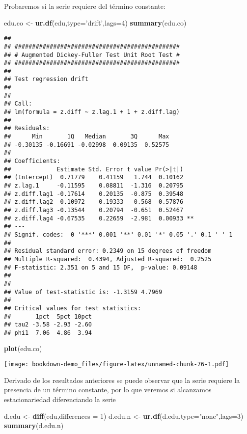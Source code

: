 \documentclass[]{book}
\newenvironment{Shaded}{\begin{snugshade}}{\end{snugshade}}
\newcommand{\KeywordTok}[1]{\textcolor[rgb]{0.13,0.29,0.53}{\textbf{#1}}}
\newcommand{\DataTypeTok}[1]{\textcolor[rgb]{0.13,0.29,0.53}{#1}}
\newcommand{\DecValTok}[1]{\textcolor[rgb]{0.00,0.00,0.81}{#1}}
\newcommand{\StringTok}[1]{\textcolor[rgb]{0.31,0.60,0.02}{#1}}
\newcommand{\NormalTok}[1]{#1}
\theoremstyle{definition}
\theoremstyle{definition}
\theoremstyle{definition}
\theoremstyle{remark}
\begin{document}
Probaremos si la serie requiere del término constante:

\begin{Shaded}
\begin{Highlighting}[]
\NormalTok{edu.co <-}\StringTok{ }\KeywordTok{ur.df}\NormalTok{(edu,}\DataTypeTok{type=}\StringTok{'drift'}\NormalTok{,}\DataTypeTok{lags=}\DecValTok{4}\NormalTok{)}
\KeywordTok{summary}\NormalTok{(edu.co)}
\end{Highlighting}
\end{Shaded}

\begin{verbatim}
## 
## ############################################### 
## # Augmented Dickey-Fuller Test Unit Root Test # 
## ############################################### 
## 
## Test regression drift 
## 
## 
## Call:
## lm(formula = z.diff ~ z.lag.1 + 1 + z.diff.lag)
## 
## Residuals:
##      Min       1Q   Median       3Q      Max 
## -0.30135 -0.16691 -0.02998  0.09135  0.52575 
## 
## Coefficients:
##             Estimate Std. Error t value Pr(>|t|)   
## (Intercept)  0.71779    0.41159   1.744  0.10162   
## z.lag.1     -0.11595    0.08811  -1.316  0.20795   
## z.diff.lag1 -0.17614    0.20135  -0.875  0.39548   
## z.diff.lag2  0.10972    0.19333   0.568  0.57876   
## z.diff.lag3 -0.13544    0.20794  -0.651  0.52467   
## z.diff.lag4 -0.67535    0.22659  -2.981  0.00933 **
## ---
## Signif. codes:  0 '***' 0.001 '**' 0.01 '*' 0.05 '.' 0.1 ' ' 1
## 
## Residual standard error: 0.2349 on 15 degrees of freedom
## Multiple R-squared:  0.4394, Adjusted R-squared:  0.2525 
## F-statistic: 2.351 on 5 and 15 DF,  p-value: 0.09148
## 
## 
## Value of test-statistic is: -1.3159 4.7969 
## 
## Critical values for test statistics: 
##       1pct  5pct 10pct
## tau2 -3.58 -2.93 -2.60
## phi1  7.06  4.86  3.94
\end{verbatim}

\begin{Shaded}
\begin{Highlighting}[]
\KeywordTok{plot}\NormalTok{(edu.co)}
\end{Highlighting}
\end{Shaded}

\texttt{[image: bookdown-demo\_files/figure-latex/unnamed-chunk-76-1.pdf]}

Derivado de los resultados anteriores se puede observar que la serie
requiere la presencia de un término constante, por lo que veremos si
alcanzamos estacionariedad diferenciando la serie

\begin{Shaded}
\begin{Highlighting}[]
\NormalTok{d.edu <-}\StringTok{ }\KeywordTok{diff}\NormalTok{(edu,}\DataTypeTok{differences =} \DecValTok{1}\NormalTok{)}
\NormalTok{d.edu.n <-}\StringTok{ }\KeywordTok{ur.df}\NormalTok{(d.edu,}\DataTypeTok{type=}\StringTok{"none"}\NormalTok{,}\DataTypeTok{lags=}\DecValTok{3}\NormalTok{)}
\KeywordTok{summary}\NormalTok{(d.edu.n)}
\end{Highlighting}
\end{Shaded}
\end{document}
